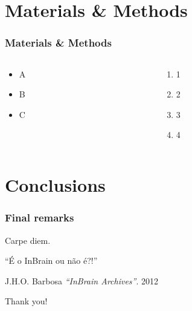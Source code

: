 \documentclass{beamer}
\begin{document}
\section[Methods]{Materials \& Methods}

\begin{frame}
    \frametitle{Materials \& Methods}

    \begin{columns}[c]
        \begin{column}{.4\textwidth}
            \begin{itemize}
                \item A
                \item B
                \item C
            \end{itemize}
        \end{column}
        \begin{column}{.4\textwidth}
            \begin{enumerate}
                \item 1
                \item 2
                \item 3
                \item 4
            \end{enumerate}
        \end{column}
    \end{columns}

\end{frame}


\section[Conclusions]{Conclusions}

\begin{frame}
    \frametitle{Final remarks}

    Carpe diem.

\end{frame}


\begin{frame}
    \centering
    {\huge``É o InBrain ou não é?!''}
    
    J.H.O. Barbosa \textit{``InBrain Archives''}. 2012
\end{frame}

\begin{frame}
    \centering
    \Huge{Thank you!}
\end{frame}
\end{document}

